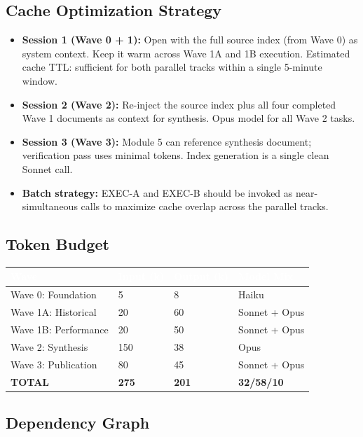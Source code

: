\documentclass[11pt,letterpaper]{article}
\newcommand{\tableheader}[1]{\textbf{\sffamily\textcolor{white}{#1}}}
\begin{document}
\subsection{Cache Optimization Strategy}

\begin{itemize}[leftmargin=*]
  \item \textbf{Session 1 (Wave 0 + 1):} Open with the full source index (from Wave 0) as system context. Keep it warm across Wave 1A and 1B execution. Estimated cache TTL: sufficient for both parallel tracks within a single 5-minute window.
  \item \textbf{Session 2 (Wave 2):} Re-inject the source index plus all four completed Wave 1 documents as context for synthesis. Opus model for all Wave 2 tasks.
  \item \textbf{Session 3 (Wave 3):} Module 5 can reference synthesis document; verification pass uses minimal tokens. Index generation is a single clean Sonnet call.
  \item \textbf{Batch strategy:} EXEC-A and EXEC-B should be invoked as near-simultaneous calls to maximize cache overlap across the parallel tracks.
\end{itemize}

\subsection{Token Budget}

\begin{center}
\begin{tabularx}{\textwidth}{L{4cm}C{2cm}C{2cm}C{2cm}}
\toprule
{}
\tableheader{Wave} & \tableheader{Input (k)} & \tableheader{Output (k)} & \tableheader{Model Mix} \\
\midrule
Wave 0: Foundation & 5 & 8 & Haiku \\
Wave 1A: Historical & 20 & 60 & Sonnet + Opus \\
Wave 1B: Performance & 20 & 50 & Sonnet + Opus \\
Wave 2: Synthesis & 150 & 38 & Opus \\
Wave 3: Publication & 80 & 45 & Sonnet + Opus \\
\midrule
\textbf{TOTAL} & \textbf{275} & \textbf{201} & \textbf{32/58/10} \\
\bottomrule
\end{tabularx}
\end{center}

\subsection{Dependency Graph}
\end{document}
